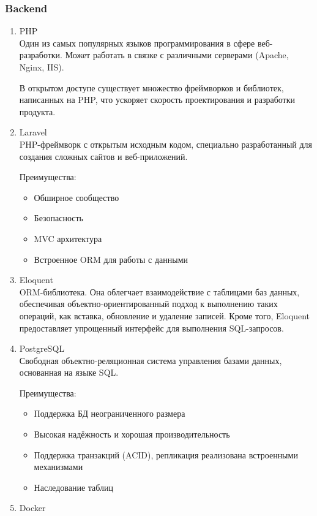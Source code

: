 \documentclass[tools.tex]{subfiles}
\begin{document}
  \subsubsection{Backend}
  \begin{enumerate}
    \item PHP\\
    Один из самых популярных языков программирования в сфере веб-разработки. Может работать в связке с различными серверами (Apache, Nginx, IIS).
    \par
    В открытом доступе существует множество фреймворков и библиотек, написанных на PHP, что ускоряет скорость проектирования и разработки продукта.
    \item Laravel\\
    PHP-фреймворк с открытым исходным кодом, специально разработанный для создания сложных сайтов и веб-приложений.
    \par
    Преимущества:
    \begin{itemize}
      \item Обширное сообщество
      \item Безопасность
      \item MVC архитектура
      \item Встроенное ORM для работы с данными
    \end{itemize}
    \item Eloquent\\
    ORM-библиотека. Она облегчает взаимодействие с таблицами баз данных, обеспечивая объектно-ориентированный подход к выполнению таких операций, как вставка, обновление и удаление записей. Кроме того, Eloquent предоставляет упрощенный интерфейс для выполнения SQL-запросов.
    \item PostgreSQL\\
    Свободная объектно-реляционная система управления базами данных, основанная на языке SQL.
    \par
    Преимущества:
    \begin{itemize}
      \item Поддержка БД неограниченного размера
      \item Высокая надёжность и хорошая производительность
      \item Поддержка транзакций (ACID), репликация реализована встроенными механизмами
      \item Наследование таблиц
    \end{itemize}
    \item Docker\\

\end{enumerate}
\end{document}
